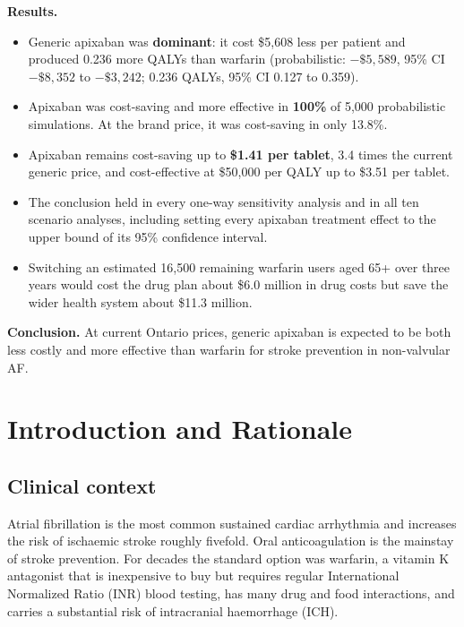 \documentclass[11pt,letterpaper]{article}
\begin{document}
\textbf{Results.}
\begin{itemize}
  \item Generic apixaban was \textbf{dominant}: it cost \$5,608 less per patient and produced
        0.236 more QALYs than warfarin (probabilistic: $-\$5{,}589$, 95\% CI $-\$8{,}352$ to
        $-\$3{,}242$; 0.236 QALYs, 95\% CI 0.127 to 0.359).
  \item Apixaban was cost-saving and more effective in \textbf{100\%} of 5,000 probabilistic
        simulations. At the brand price, it was cost-saving in only 13.8\%.
  \item Apixaban remains cost-saving up to \textbf{\$1.41 per tablet}, 3.4 times the current
        generic price, and cost-effective at \$50,000 per QALY up to \$3.51 per tablet.
  \item The conclusion held in every one-way sensitivity analysis and in all ten scenario
        analyses, including setting every apixaban treatment effect to the upper bound of its
        95\% confidence interval.
  \item Switching an estimated 16,500 remaining warfarin users aged 65+ over three years would
        cost the drug plan about \$6.0 million in drug costs but save the wider health system
        about \$11.3 million.
\end{itemize}

\textbf{Conclusion.} At current Ontario prices, generic apixaban is expected to be both less
costly and more effective than warfarin for stroke prevention in non-valvular AF.

\newpage
\tableofcontents
\newpage

\section{Introduction and Rationale}

\subsection{Clinical context}

Atrial fibrillation is the most common sustained cardiac arrhythmia and increases the risk of
ischaemic stroke roughly fivefold. Oral anticoagulation is the mainstay of stroke prevention.
For decades the standard option was warfarin, a vitamin K antagonist that is inexpensive to
buy but requires regular International Normalized Ratio (INR) blood testing, has many drug and
food interactions, and carries a substantial risk of intracranial haemorrhage (ICH).
\end{document}
